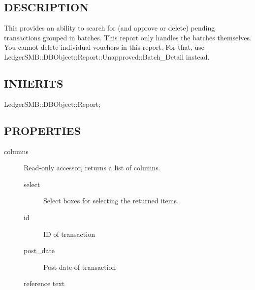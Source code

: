 \begin{description}
\begin{description}
\begin{description}
\begin{description}
\begin{description}
\begin{description}
\begin{description}
\begin{description}
\begin{description}
\begin{description}
\subsection*{DESCRIPTION\label{LedgerSMB::DBObject::Report::Unapproved::Batch_Overview_DESCRIPTION}}


This provides an ability to search for (and approve or delete) pending
transactions grouped in batches.  This report only handles the batches 
themselves.  You cannot delete individual vouchers in this report.  For that,
use LedgerSMB::DBObject::Report::Unapproved::Batch\_Detail instead.

\subsection*{INHERITS\label{LedgerSMB::DBObject::Report::Unapproved::Batch_Overview_INHERITS}}
\begin{description}

\item[{LedgerSMB::DBObject::Report;}] \mbox{}\end{description}
\subsection*{PROPERTIES\label{LedgerSMB::DBObject::Report::Unapproved::Batch_Overview_PROPERTIES}}
\begin{description}

\item[{columns}] \mbox{}

Read-only accessor, returns a list of columns.

\begin{description}

\item[{select}] \mbox{}

Select boxes for selecting the returned items.


\item[{id}] \mbox{}

ID of transaction


\item[{post\_date}] \mbox{}

Post date of transaction


\item[{reference text}] \mbox{}


\end{description}
\end{description}
\end{description}
\end{description}
\end{description}
\end{description}
\end{description}
\end{description}
\end{description}
\end{description}
\end{description}
\end{description}
